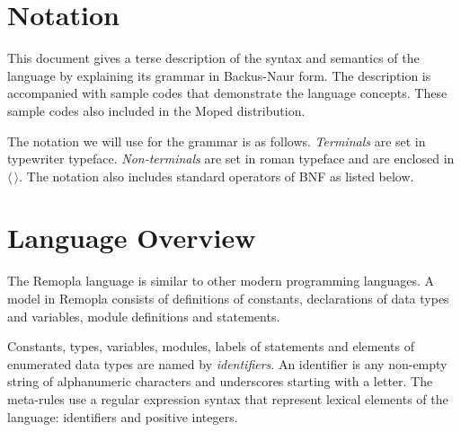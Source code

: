\documentclass[a4paper,11pt,titlepage,english]{article}
\begin{document}
\section{Notation}
This document gives a terse description of the syntax and semantics of the
language by explaining its grammar in Backus-Naur form.
The description is accompanied with sample codes that
demonstrate the language concepts. These sample codes also
included in the Moped distribution.

The notation we will use for the grammar is as follows.  \emph{Terminals\/}
are set in typewriter typeface. \emph{Non-terminals\/} are set in roman
typeface and are enclosed in $\langle\,\rangle$. The notation also includes
standard operators of BNF as listed below.

\section{Language Overview\label{s:overview}}

The Remopla language is similar to other modern programming languages. A model
in Remopla consists of definitions of constants, declarations of data types
and variables, module definitions and statements.

Constants, types, variables, modules, labels of statements and elements of
enumerated data types are named by \emph{identifiers}. An identifier is any
non-empty string of alpha\-numeric characters and underscores starting with
a letter. The
meta-rules use a regular expression syntax that represent lexical elements
of the language: identifiers and positive integers.

\begin{bnfgrammar}
[identifier]        \is [a-zA-Z]\zeromore{[a-zA-Z0-9_]} \\
[literal number]    \is \onemore{[0-9]} \\
\end{bnfgrammar}
\end{document}
